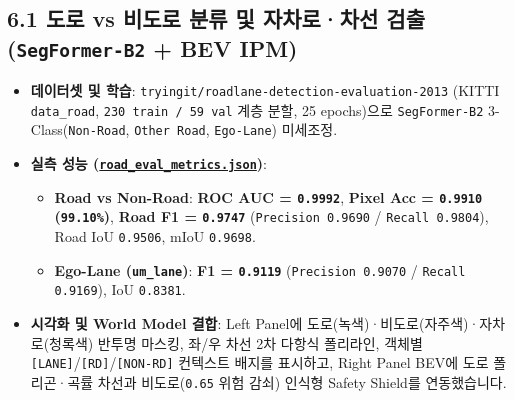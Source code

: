 \documentclass[10.5pt,a4paper]{article}
\begin{document}
\subsection{6.1 도로 vs 비도로 분류 및 자차로·차선 검출 (\texttt{SegFormer-\allowbreak{}B2} + BEV IPM)}
\begin{itemize}[leftmargin=1.5em,itemsep=2pt]
\item \textbf{데이터셋 및 학습}: \texttt{tryingit/\allowbreak{}roadlane-\allowbreak{}detection-\allowbreak{}evaluation-\allowbreak{}2013} (KITTI \texttt{data\_\allowbreak{}road}, \texttt{230 train /\allowbreak{} 59 val} 계층 분할, 25 epochs)으로 \texttt{SegFormer-\allowbreak{}B2} 3-Class(\texttt{Non-\allowbreak{}Road}, \texttt{Other Road}, \texttt{Ego-\allowbreak{}Lane}) 미세조정.
\item \textbf{실측 성능 (\href{https://github.com/Heisnotanimposter/Totalcare\_autonomous\_driving\_Yolov5/blob/main/results/v4\_road\_lane/road\_outputs/road\_lane\_outputs/road\_eval\_metrics.json}{\texttt{road\_\allowbreak{}eval\_\allowbreak{}metrics.\allowbreak{}json}})}:
\begin{itemize}[leftmargin=1.5em,itemsep=2pt]
\item \textbf{Road vs Non-Road}: \textbf{ROC AUC = \texttt{0.\allowbreak{}9992}}, \textbf{Pixel Acc = \texttt{0.\allowbreak{}9910} (\texttt{99.\allowbreak{}10\%})}, \textbf{Road F1 = \texttt{0.\allowbreak{}9747}} (\texttt{Precision 0.\allowbreak{}9690} / \texttt{Recall 0.\allowbreak{}9804}), Road IoU \texttt{0.\allowbreak{}9506}, mIoU \texttt{0.\allowbreak{}9698}.
\item \textbf{Ego-Lane (\texttt{um\_\allowbreak{}lane})}: \textbf{F1 = \texttt{0.\allowbreak{}9119}} (\texttt{Precision 0.\allowbreak{}9070} / \texttt{Recall 0.\allowbreak{}9169}), IoU \texttt{0.\allowbreak{}8381}.
\end{itemize}
\item \textbf{시각화 및 World Model 결합}: Left Panel에 도로(녹색)·비도로(자주색)·자차로(청록색) 반투명 마스킹, 좌/우 차선 2차 다항식 폴리라인, 객체별 \texttt{[LANE]}/\texttt{[RD]}/\texttt{[NON-\allowbreak{}RD]} 컨텍스트 배지를 표시하고, Right Panel BEV에 도로 폴리곤·곡률 차선과 비도로(\texttt{0.\allowbreak{}65} 위험 감쇠) 인식형 Safety Shield를 연동했습니다.
\end{itemize}
\end{document}
